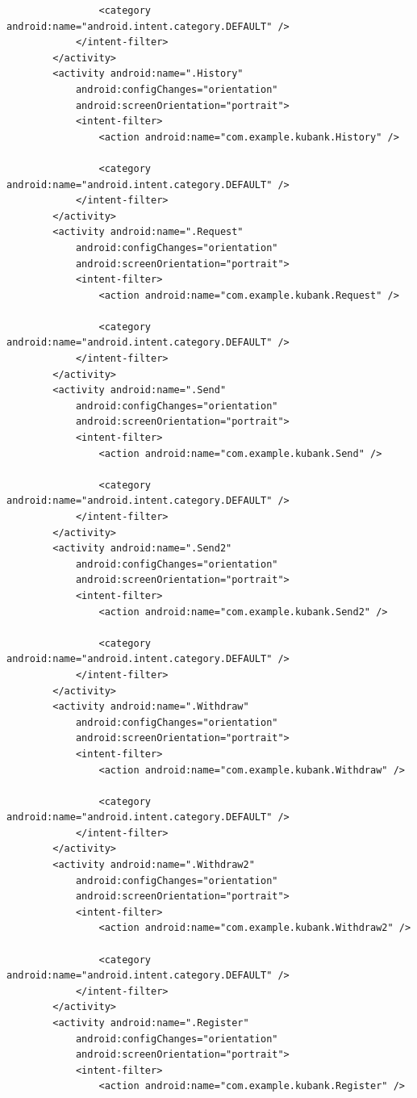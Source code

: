 \documentclass[11pt, a4paper]{article}
\begin{document}
\begin{appendices}
\begin{lstlisting}
                <category android:name="android.intent.category.DEFAULT" />
            </intent-filter>
        </activity>
        <activity android:name=".History"
            android:configChanges="orientation"
            android:screenOrientation="portrait">
            <intent-filter>
                <action android:name="com.example.kubank.History" />

                <category android:name="android.intent.category.DEFAULT" />
            </intent-filter>
        </activity>
        <activity android:name=".Request"
            android:configChanges="orientation"
            android:screenOrientation="portrait">
            <intent-filter>
                <action android:name="com.example.kubank.Request" />

                <category android:name="android.intent.category.DEFAULT" />
            </intent-filter>
        </activity>
        <activity android:name=".Send"
            android:configChanges="orientation"
            android:screenOrientation="portrait">
            <intent-filter>
                <action android:name="com.example.kubank.Send" />

                <category android:name="android.intent.category.DEFAULT" />
            </intent-filter>
        </activity>
        <activity android:name=".Send2"
            android:configChanges="orientation"
            android:screenOrientation="portrait">
            <intent-filter>
                <action android:name="com.example.kubank.Send2" />

                <category android:name="android.intent.category.DEFAULT" />
            </intent-filter>
        </activity>
        <activity android:name=".Withdraw"
            android:configChanges="orientation"
            android:screenOrientation="portrait">
            <intent-filter>
                <action android:name="com.example.kubank.Withdraw" />

                <category android:name="android.intent.category.DEFAULT" />
            </intent-filter>
        </activity>
        <activity android:name=".Withdraw2"
            android:configChanges="orientation"
            android:screenOrientation="portrait">
            <intent-filter>
                <action android:name="com.example.kubank.Withdraw2" />

                <category android:name="android.intent.category.DEFAULT" />
            </intent-filter>
        </activity>
        <activity android:name=".Register"
            android:configChanges="orientation"
            android:screenOrientation="portrait">
            <intent-filter>
                <action android:name="com.example.kubank.Register" />


\end{lstlisting}
\end{appendices}
\end{document}
